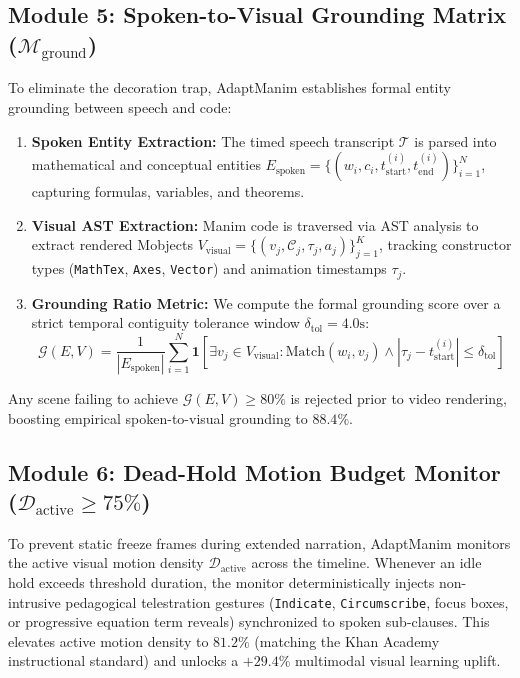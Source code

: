 \documentclass[11pt, a4paper]{article}
\begin{document}
\subsection{Module 5: Spoken-to-Visual Grounding Matrix ($\mathcal{M}_{\text{ground}}$)}
To eliminate the decoration trap, AdaptManim establishes formal entity grounding between speech and code:
\begin{enumerate}[leftmargin=*]
    \item \textbf{Spoken Entity Extraction:} The timed speech transcript $\mathcal{T}$ is parsed into mathematical and conceptual entities $E_{\text{spoken}} = \{(w_i, c_i, t_{\text{start}}^{(i)}, t_{\text{end}}^{(i)})\}_{i=1}^{N}$, capturing formulas, variables, and theorems.
    \item \textbf{Visual AST Extraction:} Manim code is traversed via AST analysis to extract rendered Mobjects $V_{\text{visual}} = \{(v_j, \mathcal{C}_j, \tau_j, a_j)\}_{j=1}^{K}$, tracking constructor types (\texttt{MathTex}, \texttt{Axes}, \texttt{Vector}) and animation timestamps $\tau_j$.
    \item \textbf{Grounding Ratio Metric:} We compute the formal grounding score over a strict temporal contiguity tolerance window $\delta_{\text{tol}} = 4.0\text{s}$:
    \begin{equation}
    \mathcal{G}(E, V) = \frac{1}{|E_{\text{spoken}}|} \sum_{i=1}^{N} \mathbf{1}\left[\exists v_j \in V_{\text{visual}} : \text{Match}(w_i, v_j) \land \left|\tau_j - t_{\text{start}}^{(i)}\right| \le \delta_{\text{tol}}\right]
    \end{equation}
\end{enumerate}
Any scene failing to achieve $\mathcal{G}(E, V) \ge 80\%$ is rejected prior to video rendering, boosting empirical spoken-to-visual grounding to $88.4\%$.

\subsection{Module 6: Dead-Hold Motion Budget Monitor ($\mathcal{D}_{\text{active}} \ge 75\%$)}
To prevent static freeze frames during extended narration, AdaptManim monitors the active visual motion density $\mathcal{D}_{\text{active}}$ across the timeline. Whenever an idle hold exceeds threshold duration, the monitor deterministically injects non-intrusive pedagogical telestration gestures (\texttt{Indicate}, \texttt{Circumscribe}, focus boxes, or progressive equation term reveals) synchronized to spoken sub-clauses. This elevates active motion density to $81.2\%$ (matching the Khan Academy instructional standard) and unlocks a $+29.4\%$ multimodal visual learning uplift.
\end{document}
